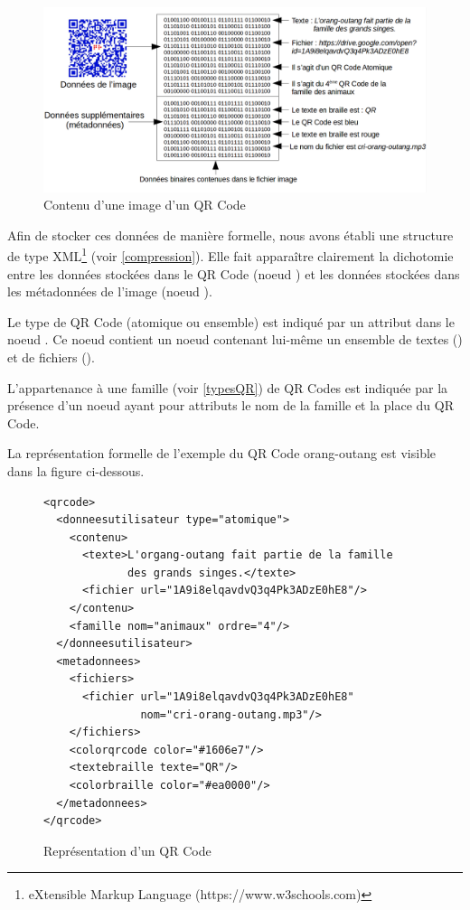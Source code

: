 \begin{figure}[!h]
	\centering
   \includegraphics[scale=0.33]{img/schema_representation_donnees.png}
   \caption{Contenu d'une image d'un QR Code}
\end{figure}

\newpage
\par
Afin de stocker ces données de manière formelle, nous avons établi une structure de type XML\footnote{eXtensible Markup Language (https://www.w3schools.com)} (voir \ref{compression}). Elle fait apparaître clairement la dichotomie entre les données stockées dans le QR Code (noeud ) et les données stockées dans les métadonnées de l'image (noeud ).
\par
Le type de QR Code (atomique ou ensemble) est indiqué par un attribut dans le noeud . Ce noeud contient un noeud  contenant lui-même un ensemble de textes () et de fichiers ().
\par
L'appartenance à une famille (voir \ref{typesQR}) de QR Codes est indiquée par la présence d'un noeud  ayant pour attributs le nom de la famille et la place du QR Code.
\par
La représentation formelle de l'exemple du QR Code orang-outang est visible dans la figure ci-dessous.

\begin{figure}[!h]
\begin{adjustbox}{minipage=\textwidth,bgcolor={RGB}{240 240 240}}

\lstset{language=XML}

\begin{lstlisting}
<qrcode>
  <donneesutilisateur type="atomique">
    <contenu>
      <texte>L'organg-outang fait partie de la famille 
             des grands singes.</texte>
      <fichier url="1A9i8elqavdvQ3q4Pk3ADzE0hE8"/>
    </contenu>
    <famille nom="animaux" ordre="4"/>
  </donneesutilisateur>
  <metadonnees>
    <fichiers>
      <fichier url="1A9i8elqavdvQ3q4Pk3ADzE0hE8" 
               nom="cri-orang-outang.mp3"/>
    </fichiers>
    <colorqrcode color="#1606e7"/>
    <textebraille texte="QR"/>
    <colorbraille color="#ea0000"/>
  </metadonnees>
</qrcode>
\end{lstlisting}

\end{adjustbox}
\caption{Représentation d'un QR Code}

\end{figure}\textbf{}